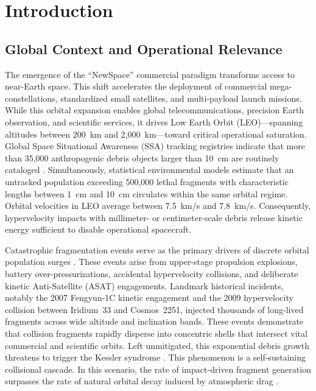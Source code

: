 \chapter{Introduction}
\label{ch:introduction}

\section{Global Context and Operational Relevance}
\label{sec:context}

The emergence of the ``NewSpace'' commercial paradigm transforms access to near-Earth space. This shift accelerates the deployment of commercial mega-constellations, standardized small satellites, and multi-payload launch missions. While this orbital expansion enables global telecommunications, precision Earth observation, and scientific services, it drives Low Earth Orbit (LEO)---spanning altitudes between 200~km and 2,000~km---toward critical operational saturation. Global Space Situational Awareness (SSA) tracking registries indicate that more than 35,000 anthropogenic debris objects larger than 10~cm are routinely cataloged \cite{anz-meador_assessment_2004}. Simultaneously, statistical environmental models estimate that an untracked population exceeding 500,000 lethal fragments with characteristic lengths between 1~cm and 10~cm circulates within the same orbital regime. Orbital velocities in LEO average between 7.5~km/s and 7.8~km/s. Consequently, hypervelocity impacts with millimeter- or centimeter-scale debris release kinetic energy sufficient to disable operational spacecraft.

Catastrophic fragmentation events serve as the primary drivers of discrete orbital population surges \cite{anz-meador_assessment_2004}. These events arise from upper-stage propulsion explosions, battery over-pressurizations, accidental hypervelocity collisions, and deliberate kinetic Anti-Satellite (ASAT) engagements. Landmark historical incidents, notably the 2007 Fengyun-1C kinetic engagement and the 2009 hypervelocity collision between Iridium~33 and Cosmos~2251, injected thousands of long-lived fragments across wide altitude and inclination bands. These events demonstrate that collision fragments rapidly disperse into concentric shells that intersect vital commercial and scientific orbits. Left unmitigated, this exponential debris growth threatens to trigger the Kessler syndrome \cite{kessler_collision_1978}. This phenomenon is a self-sustaining collisional cascade. In this scenario, the rate of impact-driven fragment generation surpasses the rate of natural orbital decay induced by atmospheric drag \cite{kessler_collision_1978}.

